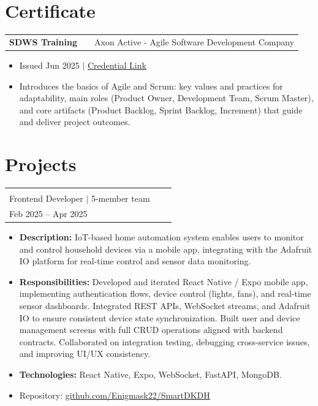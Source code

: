 \documentclass[a4paper,12pt]{article}
\makeatletter
\newenvironment{joblong}[2]
    {
    \begin{tabularx}{\linewidth}{@{}l X r@{}}
    \textbf{#1} & \hfill &  #2 \\[3.75pt]
    \end{tabularx}
    \begin{minipage}[t]{\linewidth}
    \begin{itemize}[nosep,after=\strut, leftmargin=1em, itemsep=3pt,label=--]
    }
    {
    \end{itemize}
    \end{minipage}    
    }
\makeatother
\begin{document}
\section{Certificate}
\begin{joblong}{SDWS Training}{Axon Active - Agile Software Development Company}
\item Issued Jun 2025 $|$ \href{https://verified.sertifier.com/en/verify/35754468941115/}{Credential Link}
\item Introduces the basics of Agile and Scrum: key values and practices for adaptability, main roles (Product Owner, Development Team, Scrum Master), and core artifacts (Product Backlog, Sprint Backlog, Increment) that guide and deliver project outcomes.
\end{joblong}

\section{Projects}


\begin{joblong}{{\shortstack[l]{SmartDKDH -- Home Automation System\\ Frontend Developer $|$ 5-member team}}}{{\shortstack[r]{Multidisciplinary Project\\ Feb 2025 -- Apr 2025}}}
\item \textbf{Description:} IoT-based home automation system enables users to monitor and control household devices via a mobile app, integrating with the Adafruit IO platform for real-time control and sensor data monitoring.
\item \textbf{Responsibilities:} Developed and iterated React Native / Expo mobile app, implementing authentication flows, device control (lights, fans), and real-time sensor dashboards. Integrated REST APIs, WebSocket streams, and Adafruit IO to ensure consistent device state synchronization. Built user and device management screens with full CRUD operations aligned with backend contracts. Collaborated on integration testing, debugging cross-service issues, and improving UI/UX consistency.
\item \textbf{Technologies:} React Native, Expo, WebSocket, FastAPI, MongoDB.
\item Repository: \href{https://github.com/Enigmask22/SmartDKDH}{github.com/Enigmask22/SmartDKDH}
\end{joblong}
\end{document}
